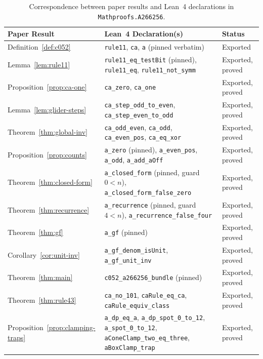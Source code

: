 \documentclass[11pt]{article}
\theoremstyle{definition}
\begin{document}
\begin{table}[ht]
\centering
\caption{Correspondence between paper results and Lean~4 declarations in \nolinkurl{Mathproofs.A266256}.}
\label{tab:lean-map}
\smallskip
{\small
\begin{tabular}{@{}l >{\raggedright\arraybackslash}p{8.2cm} l@{}}
\toprule
Paper Result & Lean~4 Declaration(s) & Status \\
\midrule
Definition~\ref{def:c052} & \texttt{rule11}, \texttt{ca}, \texttt{a} (pinned verbatim) & Exported \\
Lemma~\ref{lem:rule11} & \texttt{rule11\_eq\_testBit} (pinned), \texttt{rule11\_eq}, \texttt{rule11\_not\_symm} & Exported, proved \\
Proposition~\ref{prop:ca-one} & \texttt{ca\_zero}, \texttt{ca\_one} & Exported, proved \\
Lemma~\ref{lem:glider-steps} & \texttt{ca\_step\_odd\_to\_even}, \texttt{ca\_step\_even\_to\_odd} & Exported, proved \\
Theorem~\ref{thm:global-inv} & \texttt{ca\_odd\_even}, \texttt{ca\_odd}, \texttt{ca\_even\_pos}, \texttt{ca\_eq\_xor} & Exported, proved \\
Proposition~\ref{prop:counts} & \texttt{a\_zero} (pinned), \texttt{a\_even\_pos}, \texttt{a\_odd}, \texttt{a\_add\_aOff} & Exported, proved \\
Theorem~\ref{thm:closed-form} & \texttt{a\_closed\_form} (pinned, guard $0 < n$), \texttt{a\_closed\_form\_false\_zero} & Exported, proved \\
Theorem~\ref{thm:recurrence} & \texttt{a\_recurrence} (pinned, guard $4 < n$), \texttt{a\_recurrence\_false\_four} & Exported, proved \\
Theorem~\ref{thm:gf} & \texttt{a\_gf} (pinned) & Exported, proved \\
Corollary~\ref{cor:unit-inv} & \texttt{a\_gf\_denom\_isUnit}, \texttt{a\_gf\_unit\_inv} & Exported, proved \\
Theorem~\ref{thm:main} & \texttt{c052\_a266256\_bundle} (pinned) & Exported, proved \\
Theorem~\ref{thm:rule43} & \texttt{ca\_no\_101}, \texttt{caRule\_eq\_ca}, \texttt{caRule\_equiv\_class} & Exported, proved \\
Proposition~\ref{prop:clamping-traps} & \texttt{a\_dp\_eq\_a}, \texttt{a\_dp\_spot\_0\_to\_12}, \texttt{a\_spot\_0\_to\_12}, \texttt{aConeClamp\_two\_eq\_three}, \texttt{aBoxClamp\_trap} & Exported, proved \\
\bottomrule
\end{tabular}
}
\end{table}
\end{document}
